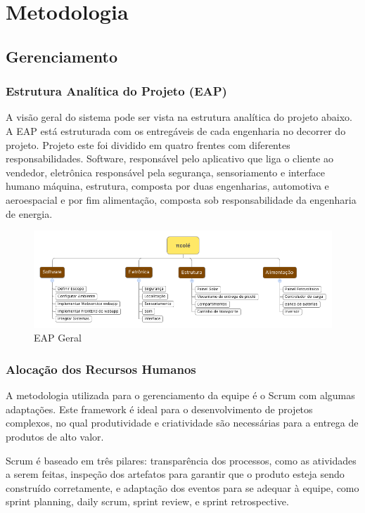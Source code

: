 \chapter{Metodologia}
\section{Gerenciamento}

\subsection{Estrutura Analítica do Projeto (EAP)}

A visão geral do sistema pode ser vista na estrutura analítica do projeto abaixo. A EAP está estruturada com os entregáveis de cada engenharia no decorrer do projeto. Projeto este foi dividido em quatro frentes com diferentes responsabilidades. Software, responsável pelo aplicativo que liga o cliente ao vendedor, eletrônica responsável pela segurança, sensoriamento e interface humano máquina, estrutura, composta por duas engenharias, automotiva e aeroespacial e por fim alimentação, composta sob responsabilidade da engenharia de energia.  

\begin{figure}[H]
	\centering
    \includegraphics[width=\textwidth]{figuras/EAP_Geral}
    \caption{EAP Geral}
    \label{fig:EAP_Geral}
\end{figure}

\subsection{Alocação dos Recursos Humanos}
A metodologia utilizada para o gerenciamento da equipe é o Scrum com algumas adaptações. Este framework é ideal para o desenvolvimento de projetos complexos, no qual produtividade e criatividade são necessárias para a entrega de produtos de alto valor.

Scrum é baseado em três pilares: transparência dos processos, como as atividades a serem feitas, inspeção dos artefatos para garantir que o produto esteja sendo construído corretamente, e adaptação dos eventos para se adequar à equipe, como sprint planning, daily scrum, sprint review, e sprint retrospective.

